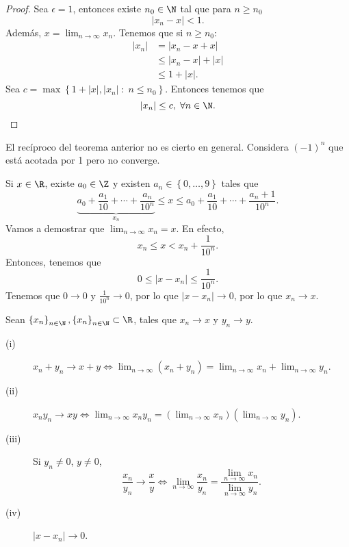 \begin{proof}
Sea $\displaystyle \epsilon = 1 $, entonces existe $\displaystyle n_{0}\in \N $ tal que para $\displaystyle n \geq n_{0} $
\[ \left|x_{n}-x\right| < 1 .\]
Además, $\displaystyle x = \lim_{n \to \infty}x_{n} $. Tenemos que si $\displaystyle n \geq n_{0} $:
\[
\begin{split}
	\left|x_{n}\right| & = \left|x_{n}-x+x\right| \\
			   & \leq \left|x_{n}-x\right| + \left|x\right| \\
			   & \leq 1 + \left|x\right|.
\end{split}
\]
Sea $\displaystyle c = \max \left\{ 1+ \left|x\right|, \left|x_{n}\right|\; : \; n \leq n_{0}\right\}  $. Entonces tenemos que 
\[ \left|x_{n}\right| \leq c, \; \forall n \in \N .\]
\end{proof}

\begin{observation}
\normalfont El recíproco del teorema anterior no es cierto en general. Considera $\displaystyle \left(-1\right)^{n} $ que está acotada por 1 pero no converge.
\end{observation}

\begin{eg}
	\normalfont Si $\displaystyle  x \in \R $, existe $\displaystyle a_{0 } \in \Z $ y existen $\displaystyle a_{n}\in \left\{ 0, \ldots, 9\right\}  $ tales que 
	\[\underbrace{a _{0} + \frac{a_{1}}{10} + \cdots + \frac{a_{n}}{10^{n}}}_{x_{n}} \leq x \leq a_{0} + \frac{a_{1}}{10} + \cdots + \frac{a_{n}+1}{10^{n}} .\]
Vamos a demostrar que $\displaystyle \lim_{n \to \infty}x_{n} = x $. En efecto, 
\[x_{n} \leq x < x_{n} + \frac{1}{10^{n}} .\]
Entonces, tenemos que
\[0 \leq \left|x - x_{n}\right| \leq \frac{1}{10^{n}} .\]
Tenemos que $\displaystyle 0 \to 0 $ y $\displaystyle \frac{1}{10^{n}} \to 0 $, por lo que $\displaystyle \left|x-x_{n}\right| \to 0 $, por lo que $\displaystyle x_{n} \to x $. 
\end{eg}

\begin{ftheorem}[]
	\normalfont Sean $\displaystyle \left\{ x_{n}\right\} _{n\in\N}, \left\{ x_{n}\right\} _{n\in\N}\subset\R $, tales que $\displaystyle x_{n} \to x $ y $\displaystyle y_{n}\to y $. 
	\begin{description}
	\item[(i)] $\displaystyle x_{n} + y _{n} \to x+y \iff \lim_{n \to \infty}\left(x_{n}+y_{n}\right) = \lim_{n \to \infty}x_{n} + \lim_{n \to \infty}y_{n}$.
	\item[(ii)] $\displaystyle x_{n}y_{n} \to xy \iff \lim_{n \to \infty}x_{n}y_{n} = \left(\lim_{n \to \infty}x_{n}\right)\left(\lim_{n \to \infty}y_{n}\right)$.
	\item[(iii)] Si $\displaystyle y_{n}\neq 0 $, $\displaystyle y\neq 0 $, 
		\[\frac{x_{n}}{y_{n}} \to \frac{x}{y} \iff \lim_{n \to \infty}\frac{x_{n}}{y_{n}} = \frac{\lim_{n \to \infty}x_{n}}{\lim_{n \to \infty}y_{n}} .\]
	\item[(iv)] $\displaystyle \left|x - x_{n}\right| \to 0 $.
	\end{description}
\end{ftheorem}

